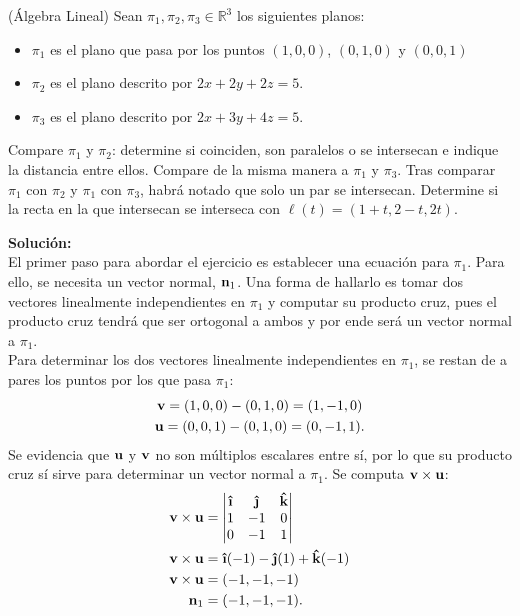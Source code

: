 \documentclass{fmbvecto}
\begin{document}
\begin{problema}
    (Álgebra Lineal) Sean \(\pi_1, \pi_2, \pi_3 \in \mathbb{R}^3\) los siguientes planos:
    \begin{itemize}
        \item \(\pi_1\) es el plano que pasa por los puntos \((1, 0, 0)\), \((0, 1, 0)\) y \((0, 0, 1)\)
        \item \(\pi_2\) es el plano descrito por \(2x + 2y + 2z = 5\).
        \item \(\pi_3\) es el plano descrito por \(2x + 3y + 4z = 5\).
    \end{itemize}
    \begin{enumerate}[label=2.\arabic*]
        \itemp[\(0.1\bar{6}\)] Compare \(\pi_1\) y \(\pi_2\): determine si coinciden, son paralelos o se intersecan e indique la distancia entre ellos.
        \itemp[\(0.1\bar{6}\)] Compare de la misma manera a \(\pi_1\) y \(\pi_3\).
        \itemp[\(0.\bar{3}\)] Tras comparar \(\pi_1\) con \(\pi_2\) y \(\pi_1\) con \(\pi_3\), habrá notado que solo un par se intersecan. Determine si la recta en la que intersecan se interseca con \(\ell(t) = (1+t, 2-t, 2t)\).
    \end{enumerate}

\vspace{1em}
\tcblower
\textbf{Solución:}\\

El primer paso para abordar el ejercicio es establecer una ecuación para \(\pi_1\). Para ello, se necesita un vector normal, \(\boldsymbol{{\mathbf{n}}}_1\). Una forma de hallarlo es tomar dos vectores linealmente independientes en \(\pi_1\) y computar su producto cruz, pues el producto cruz tendrá que ser ortogonal a ambos y por ende será un vector normal a \(\pi_1\).\\

Para determinar los dos vectores linealmente independientes en \(\pi_1\), se restan de a pares los puntos por los que pasa \(\pi_1\):
\begin{gather*}
    \boldsymbol{{\mathbf{v}}} = (1, 0, 0) - (0, 1, 0) = (1, -1, 0)\\
    \boldsymbol{{\mathbf{u}}} = (0, 0, 1) - (0, 1, 0) = (0, -1, 1).
\end{gather*}
Se evidencia que \(\boldsymbol{{\mathbf{u}}}\) y \(\boldsymbol{{\mathbf{v}}}\) no son múltiplos escalares entre sí, por lo que su producto cruz sí sirve para determinar un vector normal a \(\pi_1\). Se computa \(\boldsymbol{{\mathbf{v}}} \times \boldsymbol{{\mathbf{u}}}\):
\begin{align*}
    \bvec{v} \times \bvec{u} &= \begin{vmatrix}
        \uveci & \uvecj & \uvec{k} \\
        1 & -1 & 0 \\
        0 & -1 & 1
    \end{vmatrix} \\
    \bvec{v} \times \bvec{u} &= \uveci(-1) - \uvecj(1) + \uvec{k}(-1)\\
    \bvec{v} \times \bvec{u} &= (-1, -1, -1)\\
    \bvec{n}_1 &= (-1, -1, -1).
\end{align*}


\end{problema}
\end{document}
